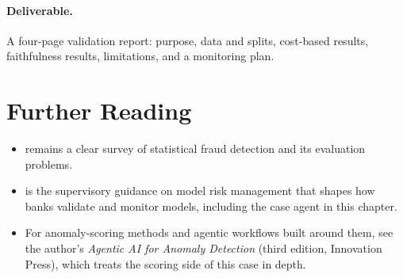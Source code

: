 \paragraph{Deliverable.} A four-page validation report: purpose, data and splits, cost-based results, faithfulness results, limitations, and a monitoring plan.

\section*{Further Reading}

\begin{itemize}[itemsep=2pt]
  \item \citet{bolton2002fraud} remains a clear survey of statistical fraud detection and its evaluation problems.
  \item \citet{fed2011sr117} is the supervisory guidance on model risk management that shapes how banks validate and monitor models, including the case agent in this chapter.
  \item For anomaly-scoring methods and agentic workflows built around them, see the author's \emph{Agentic AI for Anomaly Detection} (third edition, Innovation Press), which treats the scoring side of this case in depth.
\end{itemize}
